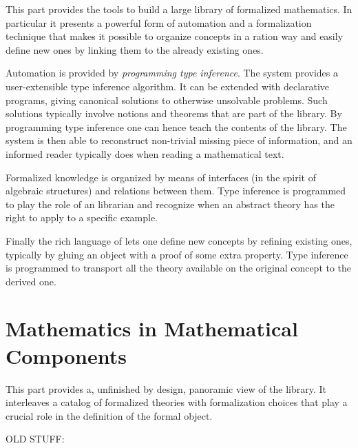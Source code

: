 \documentclass{book}
\begin{document}
This part provides the tools to build a large library of formalized
mathematics.  In particular it presents a powerful form of automation
and a formalization technique that makes it possible to organize
concepts in a ration way and easily define new ones by linking them
to the already existing ones.

Automation is provided by \emph{programming type inference}.
The \Coq{} system provides a user-extensible type inference
algorithm.  It can be extended with declarative programs,
giving canonical solutions to otherwise unsolvable problems.
Such solutions typically involve notions and theorems that
are part of the \mcbMC{} library.  By programming type inference
one can hence teach \Coq{} the contents of the library.  The system
is then able to reconstruct non-trivial missing piece of information,
and an informed reader typically does when reading a mathematical text.

Formalized knowledge is organized by means of interfaces (in the spirit of
algebraic structures) and relations between them.  Type inference is programmed
to play the role of an librarian and recognize when an abstract theory has the
right to apply to a specific example.

Finally the rich language of \Coq{} lets one define new concepts
by refining existing ones, typically by gluing an object with
a proof of some extra property.  Type inference is programmed
to transport all the theory available on
the original concept to the derived one.





\part{Mathematics in Mathematical Components}

This part provides a, unfinished by design, panoramic view of the
\mcbMC{} library.  It interleaves a catalog of formalized theories with
formalization choices that play a crucial role in the
definition of the formal object.

OLD STUFF:

\end{document}
